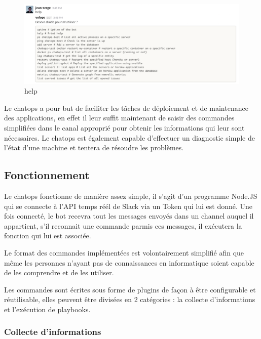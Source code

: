 \begin{figure}[htbp]
\centering
\includegraphics{help.png}
\caption{help}
\end{figure}

\bigskip

Le chatops a pour but de faciliter les tâches de déploiement et de
maintenance des applications, en effet il leur suffit maintenant de
saisir des commandes simplifiées dans le canal approprié pour obtenir
les informations qui leur sont nécessaires. Le chatops est également
capable d'effectuer un diagnostic simple de l'état d'une machine et
tentera de résoudre les problèmes.

\newpage

\subsection{Fonctionnement}\label{fonctionnement}

\bigskip

Le chatops fonctionne de manière assez simple, il s'agit d'un programme
Node.JS qui se connecte à l'API temps réél de Slack via un Token qui lui
est donné. Une fois connecté, le bot recevra tout les messages envoyés
dans un channel auquel il appartient, s'il reconnait une commande parmis
ces messages, il exécutera la fonction qui lui est associée.

\bigskip

Le format des commandes implémentées est volontairement simplifié afin
que même les personnes n'ayant pas de connaissances en informatique
soient capable de les comprendre et de les utiliser. \bigskip

Les commandes sont écrites sous forme de plugins de façon à être
configurable et réutilisable, elles peuvent être divisées en 2
catégories : la collecte d'informations et l'exécution de playbooks.

\newpage

\subsubsection{Collecte d'informations}\label{collecte-dinformations}


